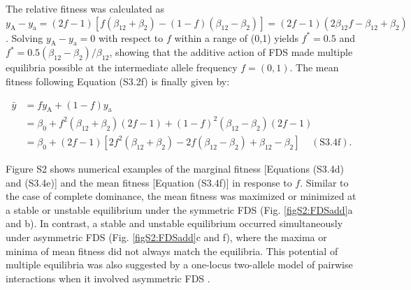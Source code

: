 \documentclass[12pt,]{article}
\begin{document}
\noindent
The relative fitness was calculated as $y_\mathrm{A} - y_\mathrm{a} = (2f-1)[f(\beta_{12}+\beta_2) - (1-f)(\beta_{12}-\beta_2)] = (2f-1)(2\beta_{12}f-\beta_{12}+\beta_2)$. Solving $y_\mathrm{A} - y_\mathrm{a} = 0$ with respect to $f$ within a range of (0,1) yields $f^*=0.5$ and $f^*=0.5(\beta_{12}-\beta_2)/\beta_{12}$, showing that the additive action of FDS made multiple equilibria possible at the intermediate allele frequency $f = (0,1)$. The mean fitness following Equation (S3.2f) is finally given by:

\begin{equation*}
\begin{split}
\bar{y} &= fy_\mathrm{A} + (1-f)y_\mathrm{a} \\
&= \beta_0 + f^2(\beta_{12}+\beta_2)(2f-1) + (1-f)^2(\beta_{12}-\beta_2)(2f-1)\\
&= \beta_0 + (2f-1)[2f^2(\beta_{12}+\beta_2)-2f(\beta_{12}-\beta_2)+\beta_{12}-\beta_2]~~~~~(\mathrm{S3.4f}).
\end{split}
\end{equation*}

\noindent
Figure S2 shows numerical examples of the marginal fitness [Equations (S3.4d) and (S3.4e)] and the mean fitness [Equation (S3.4f)] in response to $f$. Similar to the case of complete dominance, the mean fitness was maximized or minimized at a stable or unstable equilibrium under the symmetric FDS (Fig. \ref{figS2:FDSadd}a and b). In contrast, a stable and unstable equilibrium occurred simultaneously under asymmetric FDS (Fig. \ref{figS2:FDSadd}c and f), where the maxima or minima of mean fitness did not always match the equilibria. This potential of multiple equilibria was also suggested by a one-locus two-allele model of pairwise interactions when it involved asymmetric FDS \citep{schneider_maximization_2008}. 
\end{document}
